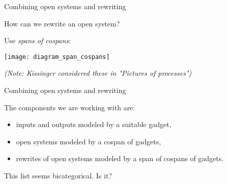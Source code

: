 
\begin{frame}{Combining open systems and rewriting}
	
	How can we rewrite an open system?
	
	\pause
	
	Use \emph{spans of cospans}:
	
	\texttt{[image: diagram\_span\_cospans]}
	
	\emph{(Note: Kissinger considered these
		in "Pictures of processes")}
		
\end{frame}


\begin{frame}{Combining open systems and rewriting}
	
	The components we are working with are:
	
	\begin{itemize}
		\item inputs and outputs modeled by a suitable gadget,
		\item open systems modeled by a cospan of gadgets,
		\item rewrites of open systems modeled by a span of cospans of gadgets.
	\end{itemize}
	
	\pause
	
	This list seems bicategorical. Is it?
	
\end{frame}


\begin{frame}
	
\end{frame}


\begin{frame}
	
\end{frame}


\begin{frame}
	
\end{frame}


\begin{frame}
	
\end{frame}


\begin{frame}
	
\end{frame}


\begin{frame}
	
\end{frame}


\begin{frame}
	
\end{frame}


